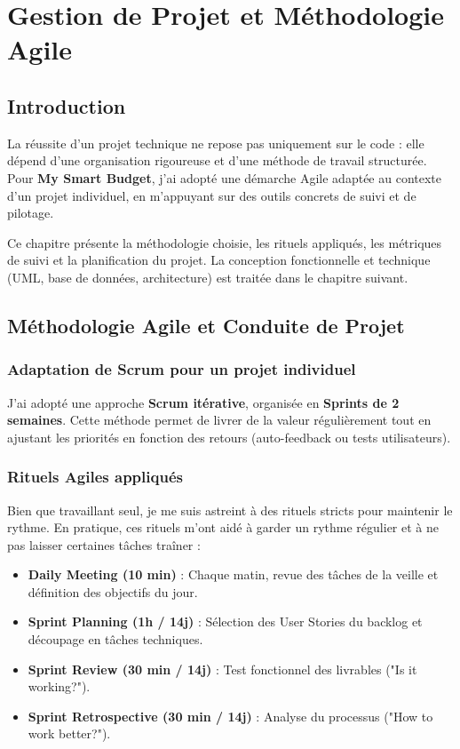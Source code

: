 \chapter{Gestion de Projet et Méthodologie Agile}

\section{Introduction}

La réussite d'un projet technique ne repose pas uniquement sur le code : elle dépend d'une organisation rigoureuse et d'une méthode de travail structurée. Pour \textbf{My Smart Budget}, j'ai adopté une démarche Agile adaptée au contexte d'un projet individuel, en m'appuyant sur des outils concrets de suivi et de pilotage.

Ce chapitre présente la méthodologie choisie, les rituels appliqués, les métriques de suivi et la planification du projet. La conception fonctionnelle et technique (UML, base de données, architecture) est traitée dans le chapitre suivant.

\section{Méthodologie Agile et Conduite de Projet}

\subsection{Adaptation de Scrum pour un projet individuel}

J'ai adopté une approche \textbf{Scrum itérative}, organisée en \textbf{Sprints de 2 semaines}. Cette méthode permet de livrer de la valeur régulièrement tout en ajustant les priorités en fonction des retours (auto-feedback ou tests utilisateurs).

\subsection{Rituels Agiles appliqués}

Bien que travaillant seul, je me suis astreint à des rituels stricts pour maintenir le rythme. En pratique, ces rituels m'ont aidé à garder un rythme régulier et à ne pas laisser certaines tâches traîner :

\begin{itemize}
    \item \textbf{Daily Meeting (10 min)} : Chaque matin, revue des tâches de la veille et définition des objectifs du jour.
    \item \textbf{Sprint Planning (1h / 14j)} : Sélection des User Stories du backlog et découpage en tâches techniques.
    \item \textbf{Sprint Review (30 min / 14j)} : Test fonctionnel des livrables ("Is it working?").
    \item \textbf{Sprint Retrospective (30 min / 14j)} : Analyse du processus ("How to work better?").
\end{itemize}

